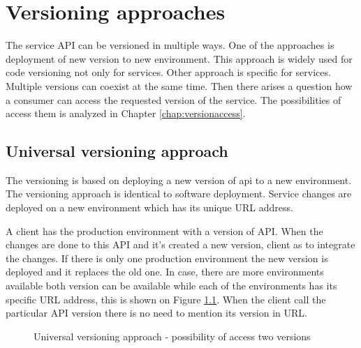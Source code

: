 \chapter{Versioning approaches}
\label{chap:versioning-approaches}

The service API can be versioned in multiple ways. One of the approaches is deployment of new version to new environment. This approach is widely used for code versioning not only for services. Other approach is specific for services. Multiple versions can coexist at the same time. Then there arises a question how a consumer can access the requested version of the service. The possibilities of access them is analyzed in Chapter \ref{chap:versionaccess}.


\section{Universal versioning approach}
The versioning is based on deploying a new version of \gls{api} to a new environment. The versioning approach is identical to software deployment. Service changes are deployed on a new environment which has its unique URL address. 


A client has the production environment with a version of API. When the changes are done to this API and it's created a new version, client as to integrate the changes. If there is only one production environment the new version is deployed and it replaces the old one. In case, there are more environments available both version can be available while each of the environments has its specific URL address, this is shown on Figure \ref{fig:universal-versioning}. When the client call the particular API version there is no need to mention its version in URL.


\begin{figure}[htp] 
\caption{Universal versioning approach - possibility of access two versions}
\label{fig:universal-versioning}
\end{figure} 


